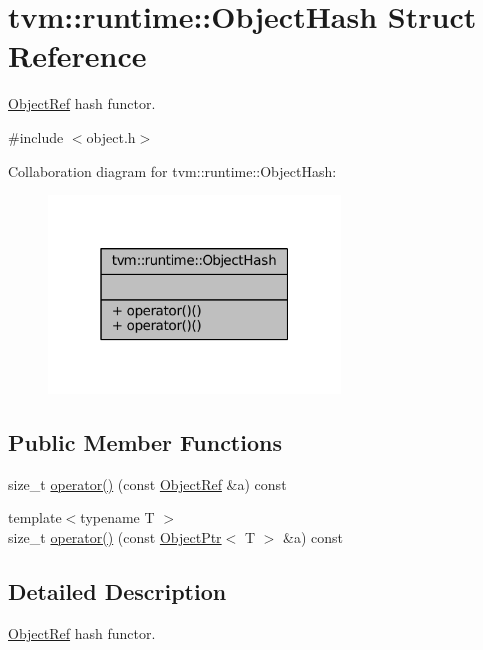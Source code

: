 \hypertarget{structtvm_1_1runtime_1_1ObjectHash}{}\section{tvm\+:\+:runtime\+:\+:Object\+Hash Struct Reference}
\label{structtvm_1_1runtime_1_1ObjectHash}


\hyperlink{classtvm_1_1runtime_1_1ObjectRef}{Object\+Ref} hash functor.  




{\ttfamily \#include $<$object.\+h$>$}



Collaboration diagram for tvm\+:\+:runtime\+:\+:Object\+Hash\+:
\nopagebreak
\begin{figure}[H]
\begin{center}
\leavevmode
\includegraphics[width=220pt]{structtvm_1_1runtime_1_1ObjectHash__coll__graph}
\end{center}
\end{figure}
\subsection*{Public Member Functions}
\begin{DoxyCompactItemize}
\item 
size\+\_\+t \hyperlink{structtvm_1_1runtime_1_1ObjectHash_a642c7d424e78d19bc2f496d4cbf67046}{operator()} (const \hyperlink{classtvm_1_1runtime_1_1ObjectRef}{Object\+Ref} \&a) const 
\item 
{\footnotesize template$<$typename T $>$ }\\size\+\_\+t \hyperlink{structtvm_1_1runtime_1_1ObjectHash_a2aa652c4d2cf9cc05a3bf0a956ccc5dd}{operator()} (const \hyperlink{classtvm_1_1runtime_1_1ObjectPtr}{Object\+Ptr}$<$ T $>$ \&a) const 
\end{DoxyCompactItemize}


\subsection{Detailed Description}
\hyperlink{classtvm_1_1runtime_1_1ObjectRef}{Object\+Ref} hash functor. 

